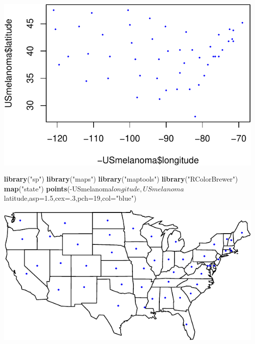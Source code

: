 \documentclass[]{article}
\newenvironment{Shaded}{\begin{snugshade}}{\end{snugshade}}
\newcommand{\KeywordTok}[1]{\textcolor[rgb]{0.13,0.29,0.53}{\textbf{{#1}}}}
\newcommand{\DataTypeTok}[1]{\textcolor[rgb]{0.13,0.29,0.53}{{#1}}}
\newcommand{\DecValTok}[1]{\textcolor[rgb]{0.00,0.00,0.81}{{#1}}}
\newcommand{\FloatTok}[1]{\textcolor[rgb]{0.00,0.00,0.81}{{#1}}}
\newcommand{\StringTok}[1]{\textcolor[rgb]{0.31,0.60,0.02}{{#1}}}
\newcommand{\NormalTok}[1]{{#1}}
\numberwithin{equation}{section}
\begin{document}
\begin{center}\includegraphics{index_files/figure-latex/unnamed-chunk-264-1} \end{center}

\begin{Shaded}
\begin{Highlighting}[]
\KeywordTok{library}\NormalTok{(}\StringTok{"sp"}\NormalTok{)}
\KeywordTok{library}\NormalTok{(}\StringTok{"maps"}\NormalTok{)}
\KeywordTok{library}\NormalTok{(}\StringTok{"maptools"}\NormalTok{)}
\KeywordTok{library}\NormalTok{(}\StringTok{"RColorBrewer"}\NormalTok{)}
\KeywordTok{map}\NormalTok{(}\StringTok{"state"}\NormalTok{)}
\KeywordTok{points}\NormalTok{(-USmelanoma$longitude,USmelanoma$latitude,}\DataTypeTok{asp=}\FloatTok{1.5}\NormalTok{,}\DataTypeTok{cex=}\NormalTok{.}\DecValTok{3}\NormalTok{,}\DataTypeTok{pch=}\DecValTok{19}\NormalTok{,}\DataTypeTok{col=}\StringTok{"blue"}\NormalTok{)}
\end{Highlighting}
\end{Shaded}

\begin{center}\includegraphics{index_files/figure-latex/unnamed-chunk-265-1} \end{center}
\end{document}
